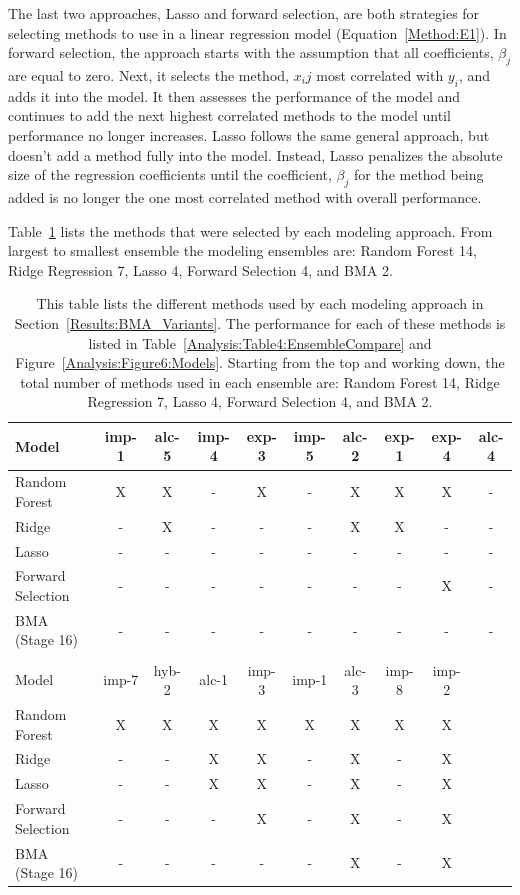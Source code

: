 \documentclass[journal=jpcbfk, manuscript=article]{achemso}
\newcommand{\+}[1]{\ensuremath{\mathbf{#1}}}
\begin{document}
The last two approaches, Lasso and forward selection, are both strategies for selecting methods to use in a linear regression model (Equation~\ref{Method:E1}). 
In forward selection, the approach starts with the assumption that all coefficients, $\beta_j$ are equal to zero.
Next, it selects the method, $x_ij$ most correlated with $y_i$, and adds it into the model. 
It then assesses the performance of the model and continues to add the next highest correlated methods to the model until performance no longer increases.
Lasso follows the same general approach, but doesn't add a method fully into the model.
Instead, Lasso penalizes the absolute size of the regression coefficients until the coefficient, $\beta_j$ for the method being added is no longer the one most correlated method with overall performance.

Table~\ref{Analysis:Table5:EnsembleVariables} lists the methods that were selected by each modeling approach. From largest to smallest ensemble the modeling ensembles are: Random Forest 14, Ridge Regression 7, Lasso 4, Forward Selection 4, and BMA 2.

\begin{table}[t!]
	\centering
	\caption[Methods used by each modeling approach]{This table lists the different methods used by each modeling approach in Section~\ref{Results:BMA_Variants}.  The performance for each of these methods is listed in Table~\ref{Analysis:Table4:EnsembleCompare} and Figure~\ref{Analysis:Figure6:Models}. Starting from the top and working down, the total number of methods used in each ensemble are: Random Forest 14, Ridge Regression 7, Lasso 4, Forward Selection 4, and BMA 2.}
	\footnotesize
	\begin{tabular}{lccccccccc}
		\hline
		\hline
		Model  & imp-1 & alc-5 & imp-4 & exp-3 & imp-5 & alc-2 & exp-1 & exp-4 & alc-4\\
		\hline
		Random Forest & X & X & - & X & - & X & X & X & -\\
		Ridge & - & X & - & - & - & X & X & - & -\\
		Lasso & - & - & - & - & - & - & - & - & -\\
		Forward Selection & - & - & - & - & - & - & - & X & -\\
		BMA (Stage 16) & - & - & - & - & - & - & - & - & -\\		
		\hline
		\\
		\hline
		Model & imp-7 & hyb-2 & alc-1 & imp-3 & imp-1 & alc-3 & imp-8 & imp-2 &\\
		\hline
		Random Forest & X & X & X & X & X & X & X & X &\\
		Ridge & - & - & X & X & - & X & - & X &\\
		Lasso & - & - & X & X & - & X & - & X &\\
		Forward Selection & - & - & - & X & - & X & - & X &\\
		BMA (Stage 16) & - & - & - & - & - & X & - & X &\\		
		\hline
		\hline
	\end{tabular}
	\label{Analysis:Table5:EnsembleVariables}
\end{table}
\end{document}
